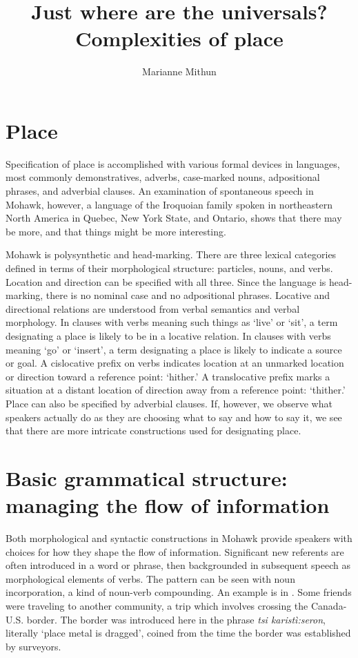 \documentclass[output=paper,colorlinks,citecolor=brown]{langscibook}
\author{Marianne Mithun\orcid{}\affiliation{University of California, Santa Barbara}}
\title{Just where are the universals? Complexities of place}
\begin{document}
\maketitle

\section{Place}

Specification of place is accomplished with various formal devices in languages, most commonly demonstratives, adverbs, case-marked nouns, adpositional phrases, and adverbial clauses. An examination of spontaneous speech in Mohawk, however, a language of the Iroquoian family spoken in northeastern North America in Quebec, New York State, and Ontario, shows that there may be more, and that things might be more interesting.

Mohawk is polysynthetic and head-marking. There are three lexical categories defined in terms of their morphological structure: particles, nouns, and verbs. Location and direction can be specified with all three. Since the language is head-marking, there is no nominal case and no adpositional phrases. Locative and directional relations are understood from verbal semantics and verbal morphology. In clauses with verbs meaning such things as `live' or `sit', a term designating a place is likely to be in a locative relation. In clauses with verbs meaning `go' or `insert', a term designating a place is likely to indicate a source or goal. A cislocative prefix on verbs indicates location at an unmarked location or direction toward a reference point: `hither.' A translocative prefix marks a situation at a distant location of direction away from a reference point: `thither.' Place can also be specified by adverbial clauses. If, however, we observe what speakers actually do as they are choosing what to say and how to say it, we see that there are more intricate constructions used for designating place.

\section{Basic grammatical structure: managing the flow of information}
Both morphological and syntactic constructions in Mohawk provide speakers with choices for how they shape the flow of information. Significant new referents are often introduced in a word or phrase, then backgrounded in subsequent speech as morphological elements of verbs. The pattern can be seen with noun incorporation, a kind of noun-verb compounding. An example is in . Some friends were traveling to another community, a trip which involves crossing the Canada-U.S. border. The border was introduced here in the phrase \emph{tsi karistì:seron}, literally `place metal is dragged', coined from the time the border was established by surveyors.
\end{document}
